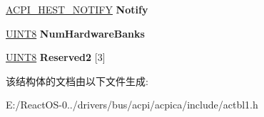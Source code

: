 \begin{DoxyCompactItemize}
\item 
\mbox{\label{structacpi__hest__ia__deferred__check_abb2b02d92a7b7909f3b09ba84de544cb}} 
\hyperlink{structacpi__hest__notify}{A\+C\+P\+I\+\_\+\+H\+E\+S\+T\+\_\+\+N\+O\+T\+I\+FY} {\bfseries Notify}
\item 
\mbox{\label{structacpi__hest__ia__deferred__check_a34912d514d66ddd8e70eb7d7cff3b389}} 
\hyperlink{_processor_bind_8h_ab27e9918b538ce9d8ca692479b375b6a}{U\+I\+N\+T8} {\bfseries Num\+Hardware\+Banks}
\item 
\mbox{\label{structacpi__hest__ia__deferred__check_abdae5a3ce7f70a9bdc6e448fa37ea62b}} 
\hyperlink{_processor_bind_8h_ab27e9918b538ce9d8ca692479b375b6a}{U\+I\+N\+T8} {\bfseries Reserved2} \mbox{[}3\mbox{]}
\end{DoxyCompactItemize}


该结构体的文档由以下文件生成\+:\begin{DoxyCompactItemize}
\item 
E\+:/\+React\+O\+S-\/0../drivers/bus/acpi/acpica/include/actbl1.\+h\end{DoxyCompactItemize}
